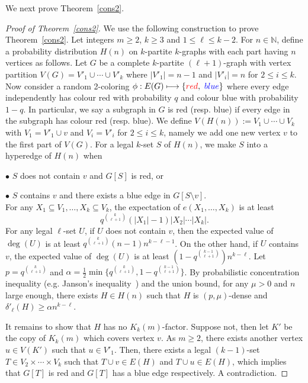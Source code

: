 \documentclass[11pt,a4paper]{article}
\theoremstyle{definition}
\begin{document}
We next prove Theorem~\ref{cons2}.

\begin{proof}[Proof of Theorem~\ref{cons2}]
    We use the following construction to prove  Theorem~\ref{cons2}. Let integers $m\geq 2$, $k\geq 3$ and $1\leq \ell \leq k-2$. For $n\in \mathbb{N}$, define a probability distribution $H(n)$ on $k$-partite $k$-graphs with each part having $n$ vertices as follows. Let $G$ be a complete $k$-partite $(\ell+1)$-graph with vertex partition $V(G)=V'_1\cup \cdots \cup V'_{k}$ where $|V'_{1}|=n-1$ and $|V'_{i}|=n$ for $2\leq i\leq k$. Now consider a random 2-coloring $\phi:E(G)\longmapsto \{{\color {red}red},~{\color{blue}blue}\}$ where every edge independently has colour {\color {red}red} with probability $q$ and colour {\color{blue}blue} with probability $1-q$. In particular, we say a subgraph in $G$ is {\color {red}red} (resp. {\color {blue}blue}) if every edge in the subgraph has colour {\color {red}red} (resp. {\color {blue}blue}). We define $V(H(n)):=V_1\cup \cdots \cup V_k$ with $V_1=V'_1\cup v$ and $V_i=V'_i$ for $2\leq i\leq k$, namely we add one new vertex $v$ to the first part of $V(G)$. For a legal $k$-set $S$ of $H(n)$, we make $S$ into a hyperedge of $H(n)$ when
    
    $\bullet$ $S$ does not contain $v$ and $G[S]$ is {\color {red}red}, or

    $\bullet$ $S$ contains $v$ and there exists a {\color {blue}blue} edge in $G[S\setminus v]$.
    ~\\

    For any $X_1\subseteq V_1, \dots ,X_k\subseteq V_k$, the expectation of $e(X_1,\dots ,X_k)$ is at least $$q^{\binom{k}{\ell+1}}(|X_1|-1)|X_2|\cdots |X_k|.$$
    For any legal $\ell$-set $U$, if $U$ does not contain $v$, then the expected value of $\deg (U)$ is at least $q^{\binom{k}{\ell+1}}(n-1)n^{k-\ell-1}$. On the other hand, if $U$ contains $v$, the expected value of $\deg(U)$ is at least $(1-q^{\binom{k-1}{\ell+1}})n^{k-\ell}$. Let $p=q^{\binom{k}{\ell+1}}$ and $\alpha =\frac{1}{2}\min \{q^{\binom{k}{\ell+1}}, 1-q^{\binom{k-1}{\ell+1}}\}$. By probabilistic concentration inequality (e.g. Janson's inequality~\cite{Alon}) and the union bound, for any $\mu >0$ and $n$ large enough, there exists $H\in H(n)$ such that $H$ is $(p,\mu)$-dense and $\delta'_{\ell}(H)\geq \alpha n^{k-\ell}$.

    It remains to show that $H$ has no $K_k(m)$-factor. Suppose not, then let $K'$ be the copy of $K_k(m)$ which covers vertex $v$. As $m\geq 2$, there exists another vertex $u\in V(K')$ such that $u\in V'_1$. Then, there exists a legal $(k-1)$-set $T\in V_2\times \cdots \times V_k$ such that $T\cup v\in E(H)$ and $T\cup u\in E(H)$, which implies that $G[T]$ is {\color {red}red} and $G[T]$ has a {\color {blue}blue} edge respectively. A contradiction.


\end{proof}
\end{document}
